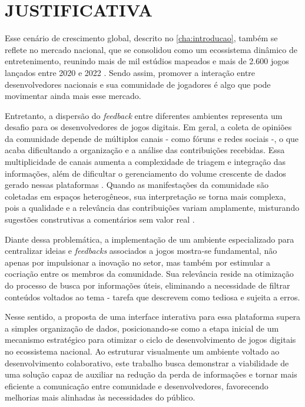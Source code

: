 \chapter{JUSTIFICATIVA} \label{cha:justificativa}

Esse cenário de crescimento global, descrito no \autoref{cha:introducao}, também se reflete no mercado nacional, que se consolidou como um ecossistema dinâmico de entretenimento, reunindo mais de mil estúdios mapeados e mais de 2.600 jogos lançados entre 2020 e 2022 \cite{abragames2023}. Sendo assim, promover a interação entre desenvolvedores nacionais e sua comunidade de jogadores é algo que pode movimentar ainda mais esse mercado.

Entretanto, a dispersão do \textit{feedback} entre diferentes ambientes representa um desafio para os desenvolvedores de jogos digitais. Em geral, a coleta de opiniões da comunidade depende de múltiplos canais - como fóruns e redes sociais -, o que acaba dificultando a organização e a análise das contribuições recebidas. Essa multiplicidade de canais aumenta a complexidade de triagem e integração das informações, além de dificultar o gerenciamento do volume crescente de dados gerado nessas plataformas \cite{xiao2025}. Quando as manifestações da comunidade são coletadas em espaços heterogêneos, sua interpretação se torna mais complexa, pois a qualidade e a relevância das contribuições variam amplamente, misturando sugestões construtivas a comentários sem valor real \cite{pagano2013}.

Diante dessa problemática, a implementação de um ambiente especializado para centralizar ideias e \textit{feedbacks} associados a jogos mostra-se fundamental, não apenas por impulsionar a inovação no setor, mas também por estimular a cocriação entre os membros da comunidade. Sua relevância reside na otimização do processo de busca por informações úteis, eliminando a necessidade de filtrar conteúdos voltados ao tema - tarefa que  descrevem como tediosa e sujeita a erros.

Nesse sentido, a proposta de uma interface
interativa para essa plataforma supera a simples organização de dados, posicionando-se como a etapa inicial de um mecanismo estratégico para otimizar o ciclo de desenvolvimento de jogos digitais no ecossistema nacional. Ao estruturar visualmente um ambiente voltado ao desenvolvimento colaborativo, este trabalho busca demonstrar a viabilidade de uma solução capaz de auxiliar na redução da perda de informações e tornar mais eficiente a comunicação entre comunidade e desenvolvedores, favorecendo melhorias mais alinhadas às necessidades do público.